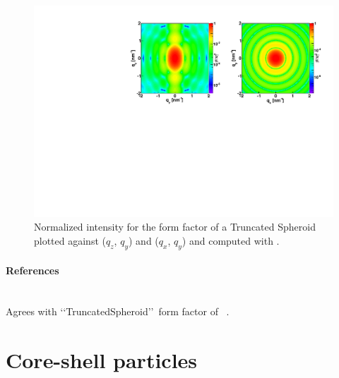 \begin{figure}[h]
\begin{center}
\includegraphics[angle=-90,width=\textwidth]{fig/ff/figffspheroid.pdf}
\end{center}
\caption{Normalized intensity for the form factor of a Truncated Spheroid plotted against ($q_z$, $q_y$) and ($q_x$, $q_y$) and
  computed with .}
\label{fig:FFspheroidEx}
\end{figure}

\paragraph{References}\strut\\
Agrees with \lq\lq TruncatedSpheroid\rq\rq\ form factor
of \IsGISAXS~\cite{Laz02}.



\clearpage
\section{Core-shell particles} \label{sec:CoreShell}

